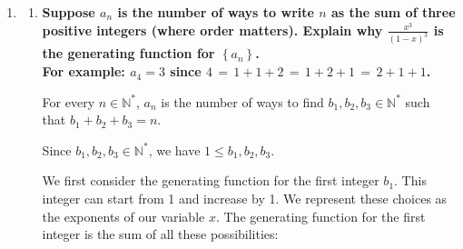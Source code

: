 \documentclass[10pt]{article}
\begin{document}
\begin{enumerate}
\begin{enumerate}
\begin{align*}
    \sum\limits_{k=1}^n\binom{k}{3} &= \binom{1}{3} + \binom{2}{3} + \binom{3}{3} + \ldots + \binom{n-1}{3} + \binom{n}{3}  \\
    &= 0 + 0 +\left(  \binom{4}{4} - \binom{3}{4} \right) + \left(  \binom{5}{4} - \binom{4}{4} \right) + \left(  \binom{5}{4} - \binom{5}{4}\right) + \ldots \\+ \left(  \binom{n}{4} - \binom{n-1}{4} \right) + \left(  \binom{n+1}{4} - \binom{n}{4} \right)\\
    &= \binom{n+1}{4} - \binom{3}{4} \\
    &= \binom{n+1}{4} \\
    &= \frac{(n+1)!}{24(n-3)!}\\
    &= \frac{(n+1)n(n-1)(n-2)}{24}
\end{align*}


We then substitute the result we have to the sum above:

\begin{align*}
    1^3+2^3+\ldots+n^3 &= \frac{n \times (n+1)}{2} + 6 \times \frac{(n+1)n(n-1)}{6} + 6 \times \frac{(n+1)n(n-1)(n-2)}{24} \\
    &= \frac{n \times (n+1)}{2} + (n+1)n(n-1) + \frac{(n+1)n(n-1)(n-2)}{4} \\
    &= \frac{n^2+n}{2} + n^3 - n + \frac{n^4 - 2n^3 -n^2 + 2n}{4} \\
     &= \frac{n^4+2n^3+n^2}{4} 
\end{align*}
\end{enumerate}


\vskip 1cm

\item
\begin{enumerate}
\item
\textbf{Suppose $a_n$ is the number of ways to write $n$ as the sum of three positive integers (where order matters).  Explain why $\frac{x^3}{(1-x)^3}$ is the generating function for $\left\{a_n\right\}$.\\ 
{\footnotesize {\bf For example:} $a_4=3$ since $4\,=\,1+1+2\,=\,1+2+1\,=\,2+1+1$.}}

For every $n \in \mathbb{N}^*$, $a_n$ is the number of ways to find $b_1, b_2, b_3 \in \mathbb{N}^*$ such that $b_1 + b_2 +b_3 = n$. 

Since $b_1, b_2, b_3 \in \mathbb{N}^*$, we have $1 \leq b_1, b_2, b_3$. 

We first consider the generating function for the first integer $b_1$.
This integer can start from 1 and increase by 1. We represent these choices as the exponents of our variable $x$. The generating function for the first integer is the sum of all these possibilities:


\end{enumerate}
\end{enumerate}
\end{document}
